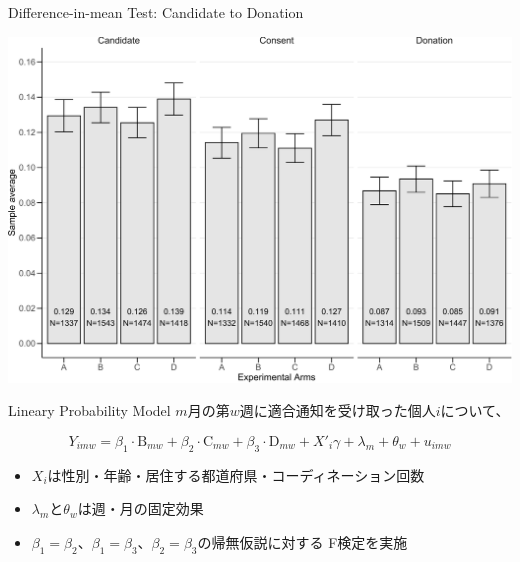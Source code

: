 \documentclass[
      aspectratio=169,
        12pt,
    ]{beamer}
\providecommand{\tightlist}{%
  \setlength{\itemsep}{0pt}\setlength{\parskip}{0pt}}
\begin{document}
\begin{frame}{Difference-in-mean Test: Candidate to Donation}
\protect\hypertarget{difference-in-mean-test-candidate-to-donation}{}
\begin{center}\includegraphics[width=0.75\linewidth]{report_files/figure-beamer/ttest-last-3step-1} \end{center}
\end{frame}

\begin{frame}{Lineary Probability Model}
\protect\hypertarget{lineary-probability-model}{}
\(m\)月の第\(w\)週に適合通知を受け取った個人\(i\)について、

\[
  Y_{imw} =
  \beta_1 \cdot \text{B}_{mw} + \beta_2 \cdot \text{C}_{mw}
  + \beta_3 \cdot \text{D}_{mw}
  + X'_i \gamma + \lambda_m + \theta_w + u_{imw}
\]

\begin{itemize}
\tightlist
\item
  \(X_i\)は性別・年齢・居住する都道府県・コーディネーション回数
\item
  \(\lambda_m\)と\(\theta_w\)は週・月の固定効果
\item
  \(\beta_1 = \beta_2\)、\(\beta_1 = \beta_3\)、\(\beta_2 = \beta_3\)の帰無仮説に対する
  F検定を実施
\end{itemize}
\end{frame}
\end{document}

